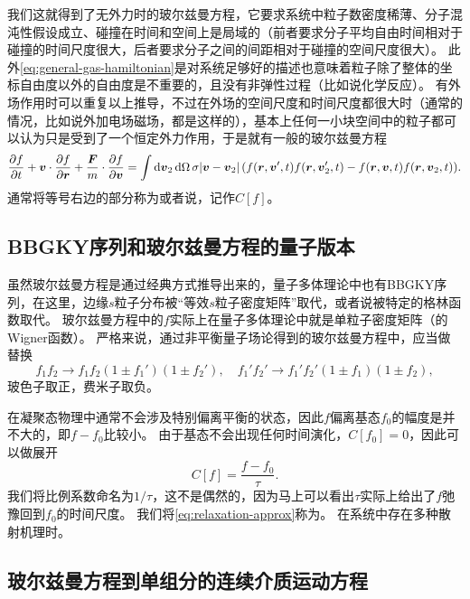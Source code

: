 我们这就得到了无外力时的玻尔兹曼方程，它要求系统中粒子数密度稀薄、分子混沌性假设成立、碰撞在时间和空间上是局域的（前者要求分子平均自由时间相对于碰撞的时间尺度很大，后者要求分子之间的间距相对于碰撞的空间尺度很大）。
此外\eqref{eq:general-gas-hamiltonian}是对系统足够好的描述也意味着粒子除了整体的坐标自由度以外的自由度是不重要的，且没有非弹性过程（比如说化学反应）。
有外场作用时可以重复以上推导，不过在外场的空间尺度和时间尺度都很大时（通常的情况，比如说外加电场磁场，都是这样的），基本上任何一小块空间中的粒子都可以认为只是受到了一个恒定外力作用，于是就有一般的玻尔兹曼方程
\begin{equation}
    \pdv{f}{t} + \vb*{v} \cdot \pdv{f}{\vb*{r}} + \frac{\vb*{F}}{m} \cdot \pdv{f}{\vb*{v}} = \int \dd{\vb*{v}_2} \dd{\Omega} \sigma \abs*{\vb*{v}-\vb*{v}_2} (f(\vb*{r}, \vb*{v}', t) f(\vb*{r}, \vb*{v}'_{2}, t) - f(\vb*{r}, \vb*{v}, t) f(\vb*{r}, \vb*{v}_{2}, t)).
    \label{eq:boltzmann-eq-with-force}
\end{equation}
通常将等号右边的部分称为或者说，记作$C[f]$。

\subsection{BBGKY序列和玻尔兹曼方程的量子版本}

虽然玻尔兹曼方程是通过经典方式推导出来的，量子多体理论中也有BBGKY序列，在这里，边缘$s$粒子分布被“等效$s$粒子密度矩阵”取代，或者说被特定的格林函数取代。
玻尔兹曼方程中的$f$实际上在量子多体理论中就是单粒子密度矩阵（的Wigner函数）。
严格来说，通过非平衡量子场论得到的玻尔兹曼方程中，应当做替换
\begin{equation}
    f_1 f_2 \longrightarrow f_1 f_2 (1 \pm f_1') (1 \pm f_2'), \quad f_1' f_2' \longrightarrow f_1' f_2' (1 \pm f_1) (1 \pm f_2),
\end{equation}
玻色子取正，费米子取负。

在凝聚态物理中通常不会涉及特别偏离平衡的状态，因此$f$偏离基态$f_0$的幅度是并不大的，即$f - f_0$比较小。
由于基态不会出现任何时间演化，$C[f_0] = 0$，因此可以做展开
\begin{equation}
    C[f] = \frac{f - f_0}{\tau}.
    \label{eq:relaxation-approx}
\end{equation}
我们将比例系数命名为$1 / \tau$，这不是偶然的，因为马上可以看出$\tau$实际上给出了$f$弛豫回到$f_0$的时间尺度。
我们将\eqref{eq:relaxation-approx}称为。
在系统中存在多种散射机理时。%

\subsection{玻尔兹曼方程到单组分的连续介质运动方程}\label{sec:boltmann-to-continuum}

